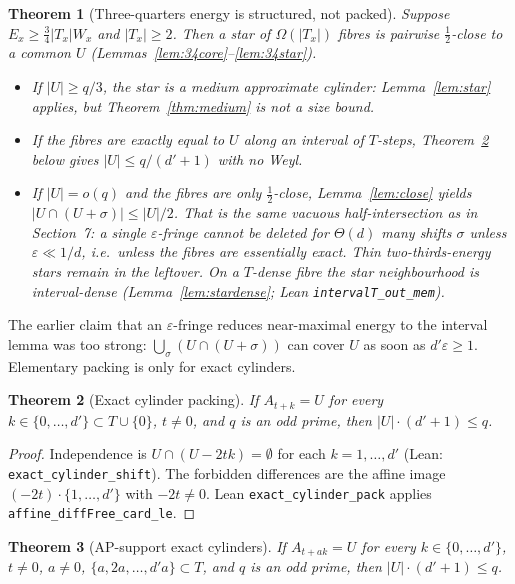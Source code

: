 \documentclass[11pt]{article}
\newtheorem{theorem}{Theorem}
\theoremstyle{definition}
\begin{document}
\begin{theorem}[Three-quarters energy is structured, not packed]\label{thm:nearmax}
Suppose $E_x\ge\tfrac34|T_x|W_x$ and $|T_x|\ge 2$.
Then a star of $\Omega(|T_x|)$ fibres is pairwise $\tfrac12$-close to a common $U$
(Lemmas~\ref{lem:34core}--\ref{lem:34star}).
\begin{itemize}
  \item If $|U|\ge q/3$, the star is a medium approximate cylinder:
        Lemma~\ref{lem:star} applies, but Theorem~\ref{thm:medium} is not a
        size bound.
  \item If the fibres are exactly equal to $U$ along an interval of $T$-steps,
        Theorem~\ref{thm:exactpack} below gives $|U|\le q/(d'+1)$ with no Weyl.
  \item If $|U|=o(q)$ and the fibres are only $\tfrac12$-close, Lemma~\ref{lem:close}
        yields $|U\cap(U+\sigma)|\le|U|/2$.
        That is the same vacuous half-intersection as in Section~7:
        a single $\varepsilon$-fringe cannot be deleted for $\Theta(d)$ many
        shifts $\sigma$ unless $\varepsilon\ll 1/d$, i.e.\ unless the fibres
        are essentially exact.
        Thin two-thirds-energy stars remain in the leftover.
        On a $T$-dense fibre the star neighbourhood is interval-dense
        (Lemma~\ref{lem:stardense}; Lean \texttt{intervalT\_out\_mem}).
\end{itemize}
\end{theorem}

The earlier claim that an $\varepsilon$-fringe reduces near-maximal energy to
the interval lemma was too strong:
$\bigcup_{\sigma}(U\cap(U+\sigma))$ can cover $U$ as soon as
$d'\varepsilon\ge 1$.
Elementary packing is only for exact cylinders.

\begin{theorem}[Exact cylinder packing]\label{thm:exactpack}
If $A_{t+k}=U$ for every $k\in\{0,\dots,d'\}\subset T\cup\{0\}$, $t\ne 0$,
and $q$ is an odd prime, then $|U|\cdot(d'+1)\le q$.
\end{theorem}

\begin{proof}
Independence is $U\cap(U-2tk)=\emptyset$ for each $k=1,\dots,d'$
(Lean: \texttt{exact\_cylinder\_shift}).
The forbidden differences are the affine image $(-2t)\cdot\{1,\dots,d'\}$
with $-2t\ne 0$.
Lean \texttt{exact\_cylinder\_pack} applies \texttt{affine\_diffFree\_card\_le}.
\end{proof}

\begin{theorem}[AP-support exact cylinders]\label{thm:exactpackap}
If $A_{t+ak}=U$ for every $k\in\{0,\dots,d'\}$, $t\ne 0$, $a\ne 0$,
$\{a,2a,\dots,d'a\}\subset T$, and $q$ is an odd prime, then
$|U|\cdot(d'+1)\le q$.
\end{theorem}
\end{document}
